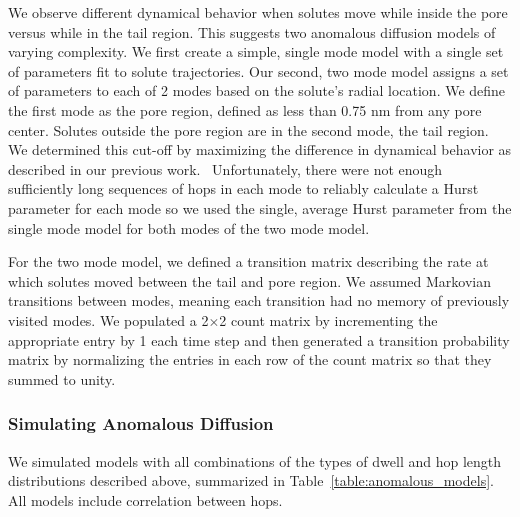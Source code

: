 \documentclass[journal=ancac3,manuscript=article,layout=twocolumn]{achemso}
\begin{document}
  We observe different dynamical behavior when solutes move while inside the
  pore versus while in the tail region. This suggests two anomalous diffusion
  models of varying complexity. We first create a simple, single mode model
  with a single set of parameters fit to solute trajectories. Our second, two
  mode model assigns a set of parameters to each of 2 modes based on the
  solute's radial location. We define the first mode as the pore region,
  defined as less than 0.75 nm from any pore center. Solutes outside the pore
  region are in the second mode, the tail region. We determined this cut-off by
  maximizing the difference in dynamical behavior as described in our previous
  work.~\cite{coscia_chemically_2019} Unfortunately, there were not enough
  sufficiently long sequences of hops in each mode to reliably calculate a
  Hurst parameter for each mode so we used the single, average Hurst parameter
  from the single mode model for both modes of the two mode model.
 
  For the two mode model, we defined a transition matrix describing the rate at
  which solutes moved between the tail and pore region. We assumed Markovian
  transitions between modes, meaning each transition had no memory of
  previously visited modes. We populated a 2$\times$2 count matrix by
  incrementing the appropriate entry by 1 each time step and then generated a
  transition probability matrix by normalizing the entries in each row of the
  count matrix so that they summed to unity.
  
  \subsubsection*{Simulating Anomalous Diffusion}

  We simulated models with all combinations of the types of dwell and hop length
  distributions described above, summarized in Table~\ref{table:anomalous_models}.
  All models include correlation between hops.
\end{document}

